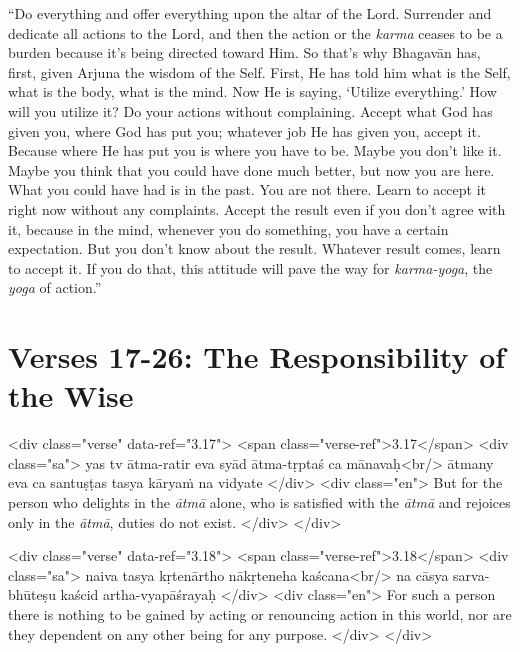 \enquote{Do everything and offer everything upon the altar of the Lord. Surrender and dedicate all actions to the Lord, and then the action or the \textit{karma} ceases to be a burden because it’s being directed toward Him. So that’s why Bhagavān has, first, given Arjuna the wisdom of the Self. First, He has told him what is the Self, what is the body, what is the mind. Now He is saying, \enquote{Utilize everything.} How will you utilize it? Do your actions without complaining. Accept what God has given you, where God has put you; whatever job He has given you, accept it. Because where He has put you is where you have to be. Maybe you don’t like it. Maybe you think that you could have done much better, but now you are here. What you could have had is in the past. You are not there. Learn to accept it right now without any complaints. Accept the result even if you don’t agree with it, because in the mind, whenever you do something, you have a certain expectation. But you don’t know about the result. Whatever result comes, learn to accept it. If you do that, this attitude will pave the way for \textit{karma-yoga}, the \textit{yoga} of action.}

\section{Verses 17-26: The Responsibility of the Wise}\label{sec-verses-17-26-the-responsibility-of-the-wise}

\begin{html}
<div class="verse" data-ref="3.17">
  <span class="verse-ref">3.17</span>
  <div class="sa">
    yas tv ātma-ratir eva syād ātma-tṛptaś ca mānavaḥ<br/>
    ātmany eva ca santuṣṭas tasya kāryaṁ na vidyate
  </div>
  <div class="en">
    But for the person who delights in the \textit{ātmā} alone, who is satisfied with the \textit{ātmā} and rejoices only in the \textit{ātmā}, duties do not exist.
  </div>
</div>
\end{html}



\begin{html}
<div class="verse" data-ref="3.18">
  <span class="verse-ref">3.18</span>
  <div class="sa">
    naiva tasya kṛtenārtho nākṛteneha kaścana<br/>
    na cāsya sarva-bhūteṣu kaścid artha-vyapāśrayaḥ
  </div>
  <div class="en">
    For such a person there is nothing to be gained by acting or renouncing action in this world, nor are they dependent on any other being for any purpose.
  </div>
</div>
\end{html}



